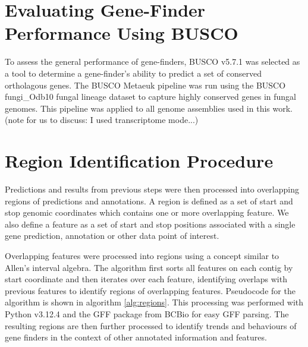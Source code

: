 \section{Evaluating Gene-Finder Performance Using BUSCO}

To assess the general performance of gene-finders, BUSCO
v5.7.1\cite{10.1093/bioinformatics/btv351} was selected as a tool to
determine a gene-finder's ability to predict a set of conserved
ortholagous genes. The BUSCO Metaeuk pipeline was run using the BUSCO
fungi\_Odb10 fungal lineage dataset to capture highly conserved genes
in fungal genomes. This pipeline was applied to all genome assemblies
used in this work. (note for us to discuss: I used transcriptome
mode...)

\section{Region Identification Procedure}
\label{section:region-met}

Predictions and results from previous steps were then processed into
overlapping regions of predictions and annotations. A region is
defined as a set of start and stop genomic coordinates which contains
one or more overlapping feature. We also define a feature as a set of
start and stop positions associated with a single gene prediction,
annotation or other data point of interest.

Overlapping features were processed into regions using a concept
similar to Allen's interval algebra\cite{DECHTER2003333}. The
algorithm first sorts all features on each contig by start coordinate
and then iterates over each feature, identifying overlaps with
previous features to identify regions of overlapping
features. Pseudocode for the algorithm is shown in algorithm
\ref{alg:regions}. This processing was performed with Python
v3.12.4\cite{Foundation} and the GFF package from BCBio\cite{Chapman}
for easy GFF parsing.  The resulting regions are then further
processed to identify trends and behaviours of gene finders in the
context of other annotated information and features.

